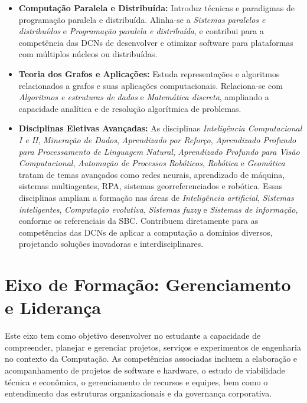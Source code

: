 \begin{itemize}
  \item \textbf{Computação Paralela e Distribuída:} Introduz técnicas e paradigmas de programação paralela e distribuída. Alinha-se a \textit{Sistemas paralelos e distribuídos} e \textit{Programação paralela e distribuída}, e contribui para a competência das DCNs de desenvolver e otimizar software para plataformas com múltiplos núcleos ou distribuídas.

  \item \textbf{Teoria dos Grafos e Aplicações:} Estuda representações e algoritmos relacionados a grafos e suas aplicações computacionais. Relaciona-se com \textit{Algoritmos e estruturas de dados} e \textit{Matemática discreta}, ampliando a capacidade analítica e de resolução algorítmica de problemas.

  \item \textbf{Disciplinas Eletivas Avançadas:} As disciplinas \textit{Inteligência Computacional I e II}, \textit{Mineração de Dados}, \textit{Aprendizado por Reforço}, \textit{Aprendizado Profundo para Processamento de Linguagem Natural}, \textit{Aprendizado Profundo para Visão Computacional}, \textit{Automação de Processos Robóticos}, \textit{Robótica} e \textit{Geomática} tratam de temas avançados como redes neurais, aprendizado de máquina, sistemas multiagentes, RPA, sistemas georreferenciados e robótica. Essas disciplinas ampliam a formação nas áreas de \textit{Inteligência artificial}, \textit{Sistemas inteligentes}, \textit{Computação evolutiva}, \textit{Sistemas fuzzy} e \textit{Sistemas de informação}, conforme os referenciais da SBC. Contribuem diretamente para as competências das DCNs de aplicar a computação a domínios diversos, projetando soluções inovadoras e interdisciplinares.
\end{itemize}

\section*{Eixo de Formação: Gerenciamento e Liderança}

Este eixo tem como objetivo desenvolver no estudante a capacidade de compreender, planejar e gerenciar projetos, serviços e experimentos de engenharia no contexto da Computação. As competências associadas incluem a elaboração e acompanhamento de projetos de software e hardware, o estudo de viabilidade técnica e econômica, o gerenciamento de recursos e equipes, bem como o entendimento das estruturas organizacionais e da governança corporativa.

